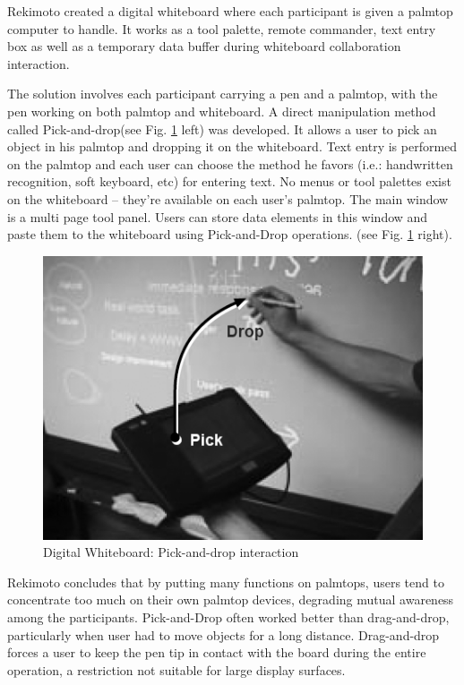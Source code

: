 Rekimoto \cite{WBOARD} created a digital whiteboard where each participant is given
a palmtop computer to handle. It works as a tool palette, remote commander, text entry box as
well as a temporary data buffer during whiteboard collaboration interaction.

The solution involves each participant carrying a pen and a palmtop,
with the pen working on both palmtop and whiteboard.
A direct manipulation method called Pick-and-drop(see Fig. \ref{FIG-WBOARD} left) was developed.
It allows a user to pick an object in his palmtop and dropping it on the whiteboard.
Text entry is performed on the palmtop and each user can choose the method he favors
(i.e.: handwritten recognition, soft keyboard, etc) for entering text.
No menus or tool palettes exist on the whiteboard -- they're available on each user's palmtop.
The main window is a multi page tool panel.
Users can store data elements in this window and paste them to the whiteboard
using Pick-and-Drop operations. (see Fig. \ref{FIG-WBOARD} right).

\begin{figure}[htb]
	\centering
	\includegraphics[width=0.4\columnwidth]{gfx/wboard.png}
	\caption{Digital Whiteboard: Pick-and-drop interaction}
	\label{FIG-WBOARD}
\end{figure}

Rekimoto concludes that by putting many functions on palmtops,
users tend to concentrate too much on their own palmtop devices,
degrading mutual awareness among the participants.
Pick-and-Drop often worked better than drag-and-drop,
particularly when user had to move objects for a long distance.
Drag-and-drop forces a user to keep the pen tip in contact
with the board during the entire operation,
a restriction not suitable for large display surfaces.





